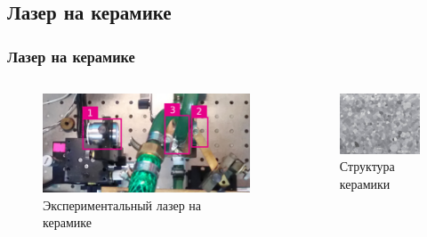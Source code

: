 \documentclass[10pt,pdf,hyperref={unicode}, dvipsnames]{beamer}
\newcommand\frametitless[1]{\subsection{#1}\frametitle{#1}}
\begin{document}
\begin{frame}[t]
	\frametitless{Лазер на керамике}
	
	\begin{columns}
		\begin{column}{0.63\textwidth}
			\begin{figure}[tb]
				\centering
				\includegraphics[width=\textwidth]{photo/s.jpg}
				\caption{Экспериментальный лазер на керамике}
			\end{figure}
		\end{column}
		\begin{column}{0.4\textwidth}
			\begin{figure}[tb]  
				\centering
				\includegraphics[width=\textwidth]{photo/ke.jpg}
				\caption{Структура керамики}
			\end{figure}
		\end{column}
	\end{columns}	
		\vspace{1em}

\end{frame}
\end{document}
